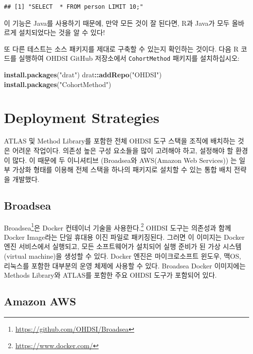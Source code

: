 \documentclass[11pt]{book}
\newenvironment{Shaded}{\begin{snugshade}}{\end{snugshade}}
\newcommand{\KeywordTok}[1]{\textcolor[rgb]{0.13,0.29,0.53}{\textbf{#1}}}
\newcommand{\StringTok}[1]{\textcolor[rgb]{0.31,0.60,0.02}{#1}}
\newcommand{\OperatorTok}[1]{\textcolor[rgb]{0.81,0.36,0.00}{\textbf{#1}}}
\newcommand{\NormalTok}[1]{#1}
\let\rmarkdownfootnote\footnote%
\def\footnote{\protect\rmarkdownfootnote}
\theoremstyle{definition}
\theoremstyle{definition}
\theoremstyle{definition}
\theoremstyle{remark}
\begin{document}
\begin{verbatim}
## [1] "SELECT  * FROM person LIMIT 10;"
\end{verbatim}

이 기능은 Java를 사용하기 때문에, 만약 모든 것이 잘 된다면, R과 Java가
모두 올바르게 설치되었다는 것을 알 수 있다!

또 다른 테스트는 소스 패키지를 제대로 구축할 수 있는지 확인하는 것이다.
다음 R 코드를 실행하여 OHDSI GitHub 저장소에서 \texttt{CohortMethod}
패키지를 설치하십시오:

\begin{Shaded}
\begin{Highlighting}[]
\KeywordTok{install.packages}\NormalTok{(}\StringTok{"drat"}\NormalTok{)}
\NormalTok{drat}\OperatorTok{::}\KeywordTok{addRepo}\NormalTok{(}\StringTok{"OHDSI"}\NormalTok{)}
\KeywordTok{install.packages}\NormalTok{(}\StringTok{"CohortMethod"}\NormalTok{)}
\end{Highlighting}
\end{Shaded}

\section{Deployment Strategies}\label{deployment-strategies}

ATLAS 및 Method Library를 포함한 전체 OHDSI 도구 스택을 조직에 배치하는
것은 어려운 작업이다. 의존성 높은 구성 요소들을 많이 고려해야 하고,
설정해야 할 환경이 많다. 이 때문에 두 이니셔티브 (Broadsea와 AWS(Amazon
Web Services)) 는 일부 가상화 형태를 이용해 전체 스택을 하나의 패키지로
설치할 수 있는 통합 배치 전략을 개발했다. 

\subsection{Broadsea}\label{broadsea}

Broadsea\footnote{\url{https://github.com/OHDSI/Broadsea}}은 Docker
컨테이너 기술을 사용한다.\footnote{\url{https://www.docker.com/}} OHDSI
도구는 의존성과 함께 Docker Image라는 단일 휴대용 이진 파일로
패키징된다. 그러면 이 이미지는 Docker 엔진 서비스에서 실행되고, 모든
소프트웨어가 설치되어 실행 준비가 된 가상 시스템(virtual machine)을
생성할 수 있다. Docker 엔진은 마이크로소프트 윈도우, 맥OS, 리눅스를
포함한 대부분의 운영 체제에 사용할 수 있다. Broadsea Docker 이미지에는
Methods Library와 ATLAS를 포함한 주요 OHDSI 도구가 포함되어 있다.

\subsection{Amazon AWS}\label{amazon-aws}
\end{document}
